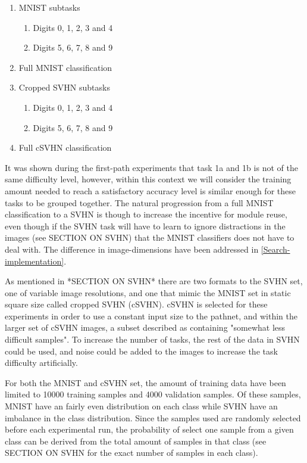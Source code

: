 \begin{enumerate}
    \item MNIST subtasks
    \begin{enumerate}
        \item Digits 0, 1, 2, 3 and 4
        \item Digits 5, 6, 7, 8 and 9 
    \end{enumerate}
    \item Full MNIST classification
    \item Cropped SVHN subtasks
    \begin{enumerate}
        \item Digits 0, 1, 2, 3 and 4
        \item Digits 5, 6, 7, 8 and 9 
    \end{enumerate}
    \item Full cSVHN classification
\end{enumerate}

It was shown during the first-path experiments that task 1a and 1b is not of the same difficulty level, however, within this context we will consider the training amount needed to reach a satisfactory accuracy level is similar enough for these tasks to be grouped together.  The natural progression from a full MNIST classification to a SVHN is though to increase the incentive for module reuse, even though if the SVHN task will have to learn to ignore distractions in the images (see SECTION ON SVHN) that the MNIST classifiers does not have to deal with. The difference in image-dimensions have been addressed in \ref{Search-implementation}.

As mentioned in *SECTION ON SVHN* there are two formats to the SVHN set, one of variable image resolutions, and one that mimic the MNIST set in static square size called cropped SVHN (cSVHN). cSVHN is selected for these experiments in order to use a constant input size to the pathnet, and within the larger set of cSVHN images, a subset described as containing "somewhat less difficult samples".
To increase the number of tasks, the rest of the data in SVHN could be used, and noise could be added to the images to increase the task difficulty artificially. 

For both the MNIST and cSVHN set, the amount of training data have been limited to 10000 training samples and 4000 validation samples. Of these samples, MNIST have an fairly even distribution on each class while SVHN have an imbalance in the class distribution. Since the samples used are randomly selected before each experimental run, the probability of select one sample from a given class can be derived from the total amount of samples in that class (see SECTION ON SVHN  for the exact number of samples in each class).

